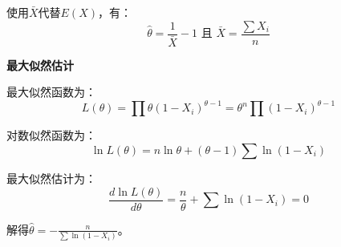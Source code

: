 \documentclass[a4paper,12pt]{ctexart}
\begin{document}
使用$\bar{X}$代替$E(X)$，有：
\begin{equation*}
	\hat{\theta} = \frac{1}{\bar{X}} - 1 \text{ 且 } \bar{X} = \frac{\sum X_i}{n}
\end{equation*}

\textbf{最大似然估计}

最大似然函数为：
\begin{equation*}
	L(\theta) = \prod \theta (1 - X_i)^{\theta - 1} = \theta^n \prod (1 - X_i)^{\theta - 1}
\end{equation*}

对数似然函数为：
\begin{equation*}
	\ln L(\theta) = n \ln \theta + (\theta - 1) \sum \ln (1 - X_i)
\end{equation*}

最大似然估计为：
\begin{equation*}
	\frac{d \ln L(\theta)}{d \theta} = \frac{n}{\theta} + \sum \ln (1 - X_i) = 0
\end{equation*}

解得$\hat{\theta} = - \frac{n}{\sum \ln (1 - X_i)}$。
\end{document}
